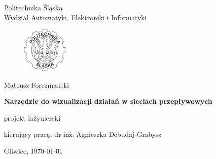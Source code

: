 

\pagestyle{empty}
\sffamily

\noindent
\begin{center}
    \Large
    Politechnika Śląska\\
    Wydział Automatyki, Elektroniki i Informatyki
\end{center}

\begin{figure}[h]
\begin{center}
\includegraphics[width=0.2\textwidth]{img/polsl.pdf}
\end{center}
\end{figure}

\vfill\vfill
\begin{center}
    \Large
    Mateusz Forczmański
\end{center}

\vfill
\begin{center}
    \Huge\bfseries
    Narzędzie do wizualizacji działań w sieciach przepływowych
\end{center}

\vfill
\begin{center}
    \Large
    projekt inżynierski
\end{center}

\vfill\vfill\vfill
\begin{center}
    \Large
    kierujący pracą: dr inż. Agnieszka Debudaj-Grabysz
\end{center}

\vfill
\begin{center}
\large
   Gliwice, \today
\end{center}

\cleardoublepage


\rmfamily
\normalfont

\pagestyle{headings}
\tableofcontents



